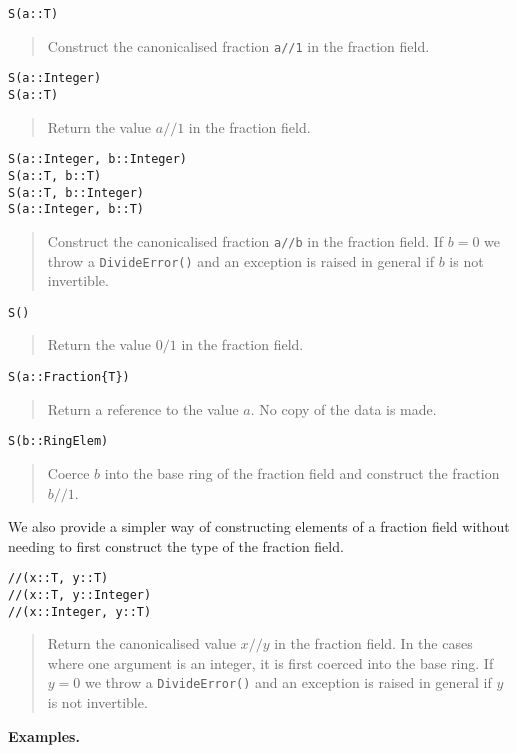\documentclass[a4paper,10pt]{article}
\newcommand{\code}{\lstinline}
\newcommand{\desc}[1]{\vspace{-3mm}\begin{quote}#1\end{quote}}
\begin{document}
\begin{lstlisting}
S(a::T)
\end{lstlisting}

\desc{Construct the canonicalised fraction \code{a//1} in the fraction field.}

\begin{lstlisting}
S(a::Integer)
S(a::T)
\end{lstlisting}

\desc{Return the value $a//1$ in the fraction field.}

\begin{lstlisting}
S(a::Integer, b::Integer)
S(a::T, b::T)
S(a::T, b::Integer)
S(a::Integer, b::T)
\end{lstlisting}

\desc{Construct the canonicalised fraction \code{a//b} in the fraction field. If
$b = 0$ we throw a \code{DivideError()} and an exception is raised in general
if $b$ is not invertible.}

\begin{lstlisting}
S()
\end{lstlisting}

\desc{Return the value $0/1$ in the fraction field.}

\begin{lstlisting}
S(a::Fraction{T})
\end{lstlisting}

\desc{Return a reference to the value $a$. No copy of the data is made.}

\begin{lstlisting}
S(b::RingElem)
\end{lstlisting}

\desc{Coerce $b$ into the base ring of the fraction field and construct the
fraction $b//1$.}

We also provide a simpler way of constructing elements of a fraction field
without needing to first construct the type of the fraction field. 

\begin{lstlisting}
//(x::T, y::T)
//(x::T, y::Integer)
//(x::Integer, y::T)
\end{lstlisting}

\desc{Return the canonicalised value $x//y$ in the fraction field. In the cases
where one argument is an integer, it is first coerced into the base ring. If
$y = 0$ we throw a \code{DivideError()} and an exception is raised in general
if $y$ is not invertible.}

\textbf{Examples.}
\end{document}
